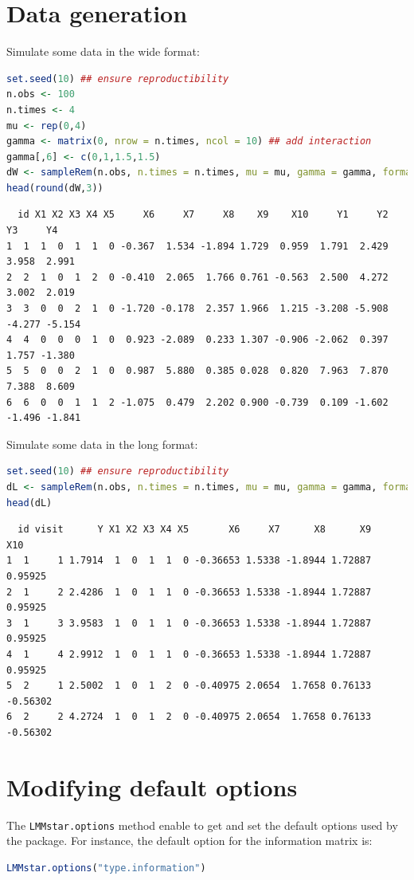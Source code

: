 \documentclass[12pt]{article}
\begin{document}
\clearpage
\section{Data generation}
\label{sec:org173e307}
Simulate some data in the wide format:
\begin{lstlisting}[language=r,numbers=none]
set.seed(10) ## ensure reproductibility
n.obs <- 100
n.times <- 4
mu <- rep(0,4)
gamma <- matrix(0, nrow = n.times, ncol = 10) ## add interaction
gamma[,6] <- c(0,1,1.5,1.5)
dW <- sampleRem(n.obs, n.times = n.times, mu = mu, gamma = gamma, format = "wide")
head(round(dW,3))
\end{lstlisting}

\label{}
\begin{verbatim}
  id X1 X2 X3 X4 X5     X6     X7     X8    X9    X10     Y1     Y2     Y3     Y4
1  1  1  0  1  1  0 -0.367  1.534 -1.894 1.729  0.959  1.791  2.429  3.958  2.991
2  2  1  0  1  2  0 -0.410  2.065  1.766 0.761 -0.563  2.500  4.272  3.002  2.019
3  3  0  0  2  1  0 -1.720 -0.178  2.357 1.966  1.215 -3.208 -5.908 -4.277 -5.154
4  4  0  0  0  1  0  0.923 -2.089  0.233 1.307 -0.906 -2.062  0.397  1.757 -1.380
5  5  0  0  2  1  0  0.987  5.880  0.385 0.028  0.820  7.963  7.870  7.388  8.609
6  6  0  0  1  1  2 -1.075  0.479  2.202 0.900 -0.739  0.109 -1.602 -1.496 -1.841
\end{verbatim}


Simulate some data in the long format:
\begin{lstlisting}[language=r,numbers=none]
set.seed(10) ## ensure reproductibility
dL <- sampleRem(n.obs, n.times = n.times, mu = mu, gamma = gamma, format = "long")
head(dL)
\end{lstlisting}

\label{}
\begin{verbatim}
  id visit      Y X1 X2 X3 X4 X5       X6     X7      X8      X9      X10
1  1     1 1.7914  1  0  1  1  0 -0.36653 1.5338 -1.8944 1.72887  0.95925
2  1     2 2.4286  1  0  1  1  0 -0.36653 1.5338 -1.8944 1.72887  0.95925
3  1     3 3.9583  1  0  1  1  0 -0.36653 1.5338 -1.8944 1.72887  0.95925
4  1     4 2.9912  1  0  1  1  0 -0.36653 1.5338 -1.8944 1.72887  0.95925
5  2     1 2.5002  1  0  1  2  0 -0.40975 2.0654  1.7658 0.76133 -0.56302
6  2     2 4.2724  1  0  1  2  0 -0.40975 2.0654  1.7658 0.76133 -0.56302
\end{verbatim}


\clearpage
\section{Modifying default options}
\label{sec:org1d611d4}
The \texttt{LMMstar.options} method enable to get and set the default options
used by the package. For instance, the default option for the information matrix is:
\begin{lstlisting}[language=r,numbers=none]
LMMstar.options("type.information")
\end{lstlisting}
\end{document}
